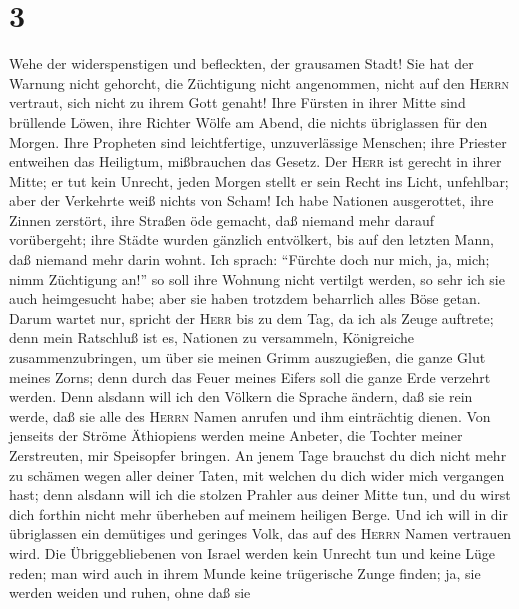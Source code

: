 \hypertarget{section-2}{%
\section{3}\label{section-2}}

 Wehe der widerspenstigen und befleckten, der grausamen
Stadt!  Sie hat der Warnung nicht gehorcht, die Züchtigung
nicht angenommen, nicht auf den \textsc{Herrn} vertraut, sich nicht zu
ihrem Gott genaht!  Ihre Fürsten in ihrer Mitte sind
brüllende Löwen, ihre Richter Wölfe am Abend, die nichts übriglassen für
den Morgen.  Ihre Propheten sind leichtfertige,
unzuverlässige Menschen; ihre Priester entweihen das Heiligtum,
mißbrauchen das Gesetz.  Der \textsc{Herr} ist gerecht in
ihrer Mitte; er tut kein Unrecht, jeden Morgen stellt er sein Recht ins
Licht, unfehlbar; aber der Verkehrte weiß nichts von Scham!
 Ich habe Nationen ausgerottet, ihre Zinnen zerstört, ihre
Straßen öde gemacht, daß niemand mehr darauf vorübergeht; ihre Städte
wurden gänzlich entvölkert, bis auf den letzten Mann, daß niemand mehr
darin wohnt.  Ich sprach: ``Fürchte doch nur mich, ja,
mich; nimm Züchtigung an!'' so soll ihre Wohnung nicht vertilgt werden,
so sehr ich sie auch heimgesucht habe; aber sie haben trotzdem
beharrlich alles Böse getan.  Darum wartet nur, spricht
der \textsc{Herr} bis zu dem Tag, da ich als Zeuge auftrete; denn mein
Ratschluß ist es, Nationen zu versammeln, Königreiche zusammenzubringen,
um über sie meinen Grimm auszugießen, die ganze Glut meines Zorns; denn
durch das Feuer meines Eifers soll die ganze Erde verzehrt werden.
 Denn alsdann will ich den Völkern die Sprache ändern, daß
sie rein werde, daß sie alle des \textsc{Herrn} Namen anrufen und ihm
einträchtig dienen.  Von jenseits der Ströme Äthiopiens
werden meine Anbeter, die Tochter meiner Zerstreuten, mir Speisopfer
bringen.  An jenem Tage brauchst du dich nicht mehr zu
schämen wegen aller deiner Taten, mit welchen du dich wider mich
vergangen hast; denn alsdann will ich die stolzen Prahler aus deiner
Mitte tun, und du wirst dich forthin nicht mehr überheben auf meinem
heiligen Berge.  Und ich will in dir übriglassen ein
demütiges und geringes Volk, das auf des \textsc{Herrn} Namen vertrauen
wird.  Die Übriggebliebenen von Israel werden kein
Unrecht tun und keine Lüge reden; man wird auch in ihrem Munde keine
trügerische Zunge finden; ja, sie werden weiden und ruhen, ohne daß sie
